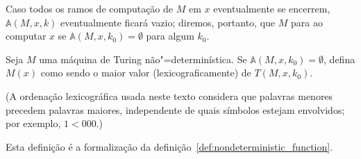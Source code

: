Caso todos os ramos de computação de $M$ em $x$ eventualmente se encerrem,
$\mathbb A(M, x, k)$ eventualmente ficará vazio;
diremos,
portanto,
que $M$ para ao computar $x$ se $\mathbb A(M, x, k_0) = \emptyset$
para algum $k_0$.

\begin{definition}
    Seja $M$ uma máquina de Turing não"=determinística.
    Se $\mathbb A(M, x, k_0) = \emptyset$,
    defina $M(x)$ como sendo o maior valor
    (lexicograficamente)
    de $T(M, x, k_0)$.
\end{definition}
(A ordenação lexicográfica usada neste texto
considera que palavras menores precedem palavras maiores,
independente de quais símbolos estejam envolvidos;
por exemplo, $1 < 000$.)

Esta definição é a formalização da definição~\ref{def:nondeterministic_function}.
